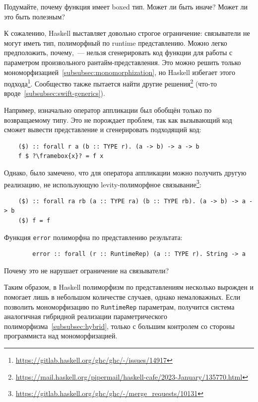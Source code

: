 \begin{task}
    Подумайте, почему функция имеет boxed тип.
    Может ли быть иначе?
    Может ли это быть полезным?
\end{task}

К сожалению, Haskell выставляет довольно строгое ограничение: связыватели не могут иметь тип, полиморфный по runtime представлению.
Можно легко предположить, почему,~--- нельзя сгенерировать код функции для работы с параметром произвольного рантайм-представления.
Это можно решить только мономорфизацией~\ref{subsubsec:monomorphization}, но Haskell избегает этого подхода\footnote{\url{https://gitlab.haskell.org/ghc/ghc/-/issues/14917}}.
Сообщество также пытается найти другие решения\footnote{\url{https://mail.haskell.org/pipermail/haskell-cafe/2023-January/135770.html}} (что-то вроде~\ref{subsubsec:swift-generics}).

Например, изначально оператор аппликации был обобщён только по возвращаемому типу.
Это не порождает проблем, так как вызывающий код сможет вывести представление и сгенерировать подходящий код:
\begin{verbatim}
    ($) :: forall r a (b :: TYPE r). (a -> b) -> a -> b
    f $ ?\framebox{x}? = f x
\end{verbatim}
Однако, было замечено, что для оператора аппликации можно получить другую реализацию, не использующую levity-полиморфное связывание\footnote{\url{https://gitlab.haskell.org/ghc/ghc/-/merge_requests/10131}}:
\begin{verbatim}
    ($) :: forall ra rb (a :: TYPE ra) (b :: TYPE rb). (a -> b) -> a -> b
    ($) f = f
\end{verbatim}

\begin{task}
    Функция \texttt{error} полиморфна по представлению результата:
    \begin{verbatim}
        error :: forall (r :: RuntimeRep) (a :: TYPE r). String -> a
    \end{verbatim}
    Почему это не нарушает ограничение на связыватели?
\end{task}

Таким образом, в Haskell полиморфизм по представлениям несколько вырожден и помогает лишь в небольшом количестве случаев, однако немаловажных.
Если позволить мономорфизацию по \texttt{RuntimeRep} параметрам, получится система аналогичная гибридной реализации параметрического полиморфизма~\ref{subsubsec:hybrid}, только с большим контролем со стороны программиста над мономорфизацией.

